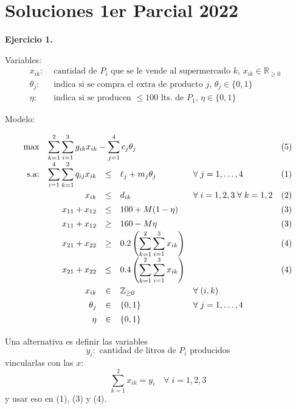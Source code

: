 \documentclass[a4paper,oneside,12pt]{amsart}
\def \ds{\displaystyle}
\begin{document}
\section*{Soluciones 1er Parcial 2022}

\textbf{Ejercicio 1.}
\vspace{0.2cm}

Variables:
\[
\begin{array}{rl}
    x_{ik}\colon & \text{ cantidad de $P_i$ que se le vende al supermercado $k$, $x_{ik}\in\mathbb{R}_{\geq 0}$ } \\
     \theta_j \colon & \text{ indica si se compra el extra de producto $j$, $\theta_j\in\{0,1\}$} \\
     \eta \colon & \text{ indica si se producen $\leq 100$ lts. de $P_1$, $\eta\in\{0,1\}$}
\end{array}
\]

Modelo:

\[\def\arraystretch{1.4}
    \begin{array}{rrcllr}
         \max & \multicolumn{4}{l}{\ds\sum_{k=1}^2\sum_{i=1}^3 g_{ik}x_{ik} - \sum_{j=1}^4 c_j\theta_j} & (5) \\
         \text{s.a:} & \ds\sum_{i=1}^4\sum_{k=1}^2  q_{ij}x_{ik} & \leq & \ell_j + m_j\theta_j & \forall\;j=1,\dots,4 & (1) \\ 
         & x_{ik} & \leq & d_{ik} & \forall\; i=1,2,3 \;\forall\;k=1,2 & (2) \\
         & x_{11} + x_{12} & \leq & 100 + M(1-\eta) & & (3) \\
         & x_{11} + x_{12} & \geq & 160 - M\eta & & (3) \\
         & x_{21} + x_{22} & \geq & 0.2\left( \ds\sum_{k=1}^2\sum_{i=1}^3 x_{ik} \right) & & (4) \\
         & x_{21} + x_{22} & \leq & 0.4\left( \ds\sum_{k=1}^2\sum_{i=1}^3 x_{ik} \right) & & (4) \\
         & x_{ik} & \in & \mathbb{Z}_{\geq 0} & \forall\; (i,k) & \\
         & \theta_{j} & \in & \{0,1\} & \forall\; j=1,\dots,4 & \\
         & \eta & \in & \{0,1\} & & \\
    \end{array}
\]


\vspace{2cm}
Una alternativa es definir las variables
\[ y_i\colon \text{ cantidad de litros de $P_i$ producidos}\]
vincularlas con las $x$:
\[ \ds\sum_{k=1}^2 x_{ik} = y_i \quad \forall\; i=1,2,3\]
y usar eso en (1), (3) y (4).
\end{document}
